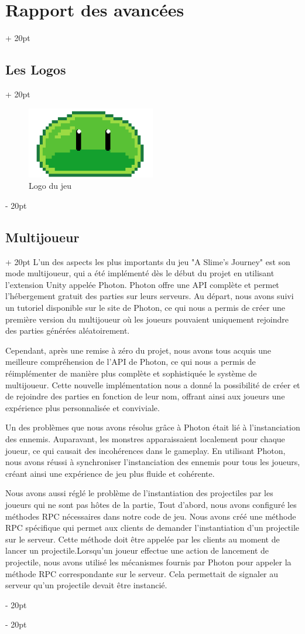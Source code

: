 \documentclass[a4paper, 12pt, twoside]{article}
\newcommand{\ind}[1][20pt]{\advance\leftskip + #1}
\newcommand{\deind}[1][20pt]{\advance\leftskip - #1}
\newenvironment{indt}[2][20pt]{#2 \par \ind[#1]}{\par \deind} %
\begin{document}
\begin{indt}{\section{Rapport des avancées}}
\begin{indt}{\subsection{Les Logos}}
            \begin{figure}[h]
                \centering
                \includegraphics[width=0.5\textwidth]{logo.png}
                \caption{Logo du jeu}
                \label{fig:mesh1}
            \end{figure}
        \end{indt}

        \newpage

        \begin{indt}{\subsection{Multijoueur}}
            L'un des aspects les plus importants du jeu "A Slime's Journey" est son mode multijoueur, qui a été implémenté dès le début du projet en utilisant l'extension Unity appelée Photon. Photon offre une API complète et permet l'hébergement gratuit des parties sur leurs serveurs. Au départ, nous avons suivi un tutoriel disponible sur le site de Photon, ce qui nous a permis de créer une première version du multijoueur où les joueurs pouvaient uniquement rejoindre des parties générées aléatoirement.

            Cependant, après une remise à zéro du projet, nous avons tous acquis une meilleure compréhension de l'API de Photon, ce qui nous a permis de réimplémenter de manière plus complète et sophistiquée le système de multijoueur. Cette nouvelle implémentation nous a donné la possibilité de créer et de rejoindre des parties en fonction de leur nom, offrant ainsi aux joueurs une expérience plus personnalisée et conviviale.

            Un des problèmes que nous avons résolus grâce à Photon était lié à l'instanciation des ennemis. Auparavant, les monstres apparaissaient localement pour chaque joueur, ce qui causait des incohérences dans le gameplay. En utilisant Photon, nous avons réussi à synchroniser l'instanciation des ennemis pour tous les joueurs, créant ainsi une expérience de jeu plus fluide et cohérente.

            Nous avons aussi réglé le problème de l’instantiation des projectiles par les joueurs qui ne sont pas hôtes de la partie, Tout d'abord, nous avons configuré les méthodes RPC nécessaires dans notre code de jeu. Nous avons créé une méthode RPC spécifique qui permet aux clients de demander l'instantiation d'un projectile sur le serveur. Cette méthode doit être appelée par les clients au moment de lancer un projectile.Lorsqu'un joueur effectue une action de lancement de projectile, nous avons utilisé les mécanismes fournis par Photon pour appeler la méthode RPC correspondante sur le serveur. Cela permettait de signaler au serveur qu'un projectile devait être instancié.


\end{indt}
\end{indt}
\end{document}
